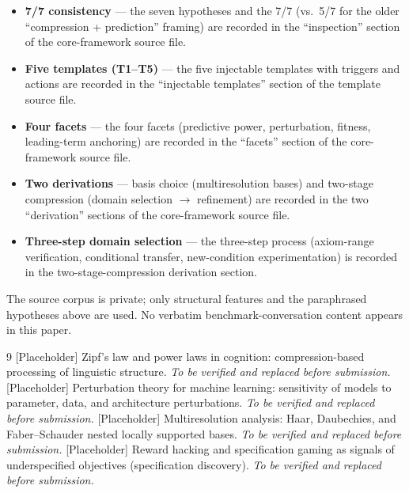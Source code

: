 \begin{itemize}
\item \textbf{7/7 consistency} --- the seven hypotheses and the 7/7 (vs.\ 5/7
for the older ``compression + prediction'' framing) are recorded in the
``inspection'' section of the core-framework source file.
\item \textbf{Five templates (T1--T5)} --- the five injectable templates with
triggers and actions are recorded in the ``injectable templates'' section of the
template source file.
\item \textbf{Four facets} --- the four facets (predictive power, perturbation,
fitness, leading-term anchoring) are recorded in the ``facets'' section of the
core-framework source file.
\item \textbf{Two derivations} --- basis choice (multiresolution bases) and
two-stage compression (domain selection $\to$ refinement) are recorded in the
two ``derivation'' sections of the core-framework source file.
\item \textbf{Three-step domain selection} --- the three-step process
(axiom-range verification, conditional transfer, new-condition experimentation)
is recorded in the two-stage-compression derivation section.
\end{itemize}

The source corpus is private; only structural features and the paraphrased
hypotheses above are used. No verbatim benchmark-conversation content appears in
this paper.

\begin{thebibliography}{9}
[Placeholder] Zipf's law and power laws in cognition: compression-based
processing of linguistic structure. \emph{To be verified and replaced before
submission.}
[Placeholder] Perturbation theory for machine learning: sensitivity of models to
parameter, data, and architecture perturbations. \emph{To be verified and
replaced before submission.}
[Placeholder] Multiresolution analysis: Haar, Daubechies, and Faber--Schauder
nested locally supported bases. \emph{To be verified and replaced before
submission.}
[Placeholder] Reward hacking and specification gaming as signals of
underspecified objectives (specification discovery). \emph{To be verified and
replaced before submission.}
\end{thebibliography}


